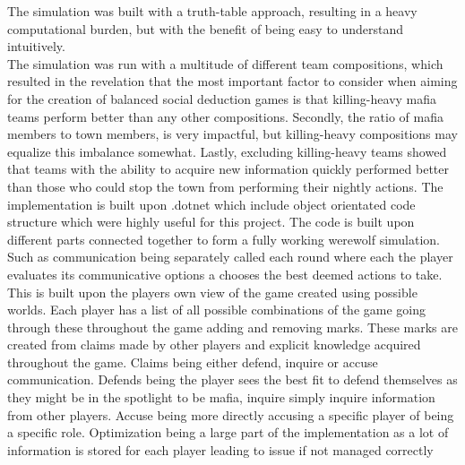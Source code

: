 The simulation was built with a truth-table approach, resulting in a heavy
computational burden, but with the benefit of being easy to understand
intuitively. \\
The simulation was run with a multitude of different team compositions, which
resulted in the revelation that the most important factor to consider when
aiming for the creation of balanced social deduction games is that killing-heavy mafia teams perform better than any other compositions. Secondly, the ratio of mafia members to town members, is very impactful, but killing-heavy compositions may equalize this imbalance somewhat. Lastly, excluding killing-heavy teams showed that teams with the ability to acquire new information quickly performed better than those who could stop the town from performing their nightly actions.
The implementation is built upon .dotnet which include object orientated code
structure which were highly useful for this project. The code is built upon
different parts connected together to form a fully working werewolf simulation.
Such as communication being separately called each round where each the player
evaluates its communicative options a chooses the best deemed actions to take.
This is built upon the players own view of the game created using possible
worlds. Each player has a list of all possible combinations of the game going
through these throughout the game adding and removing marks. These marks are
created from claims made by other players and explicit knowledge acquired
throughout the game. Claims being either defend, inquire or accuse communication.
Defends being the player sees the best fit to defend themselves as they might
be in the spotlight to be mafia, inquire simply inquire information from other
players. Accuse being more directly accusing a specific player of being a
specific role. Optimization being a large part of the implementation as a lot
of information is stored for each player leading to issue if not managed
correctly
\twocolumn